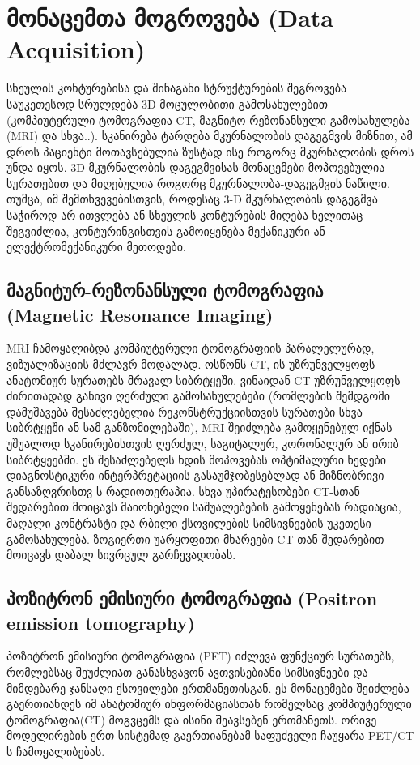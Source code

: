 \documentclass[12pt,a4paper,]{report}
\begin{document}
\chapter{მონაცემთა მოგროვება (Data Acquisition)}
სხეულის კონტურებისა და შინაგანი სტრუქტურების შეგროვება საუკეთესოდ სრულდება 3D მოცულობითი გამოსახულებით (კომპიუტერული ტომოგრაფია CT, მაგნიტო რეზონანსული გამოსახულება (MRI) და სხვა..). სკანირება ტარდება მკურნალობის დაგეგმვის მიზნით, ამ დროს პაციენტი მოთავსებულია ზუსტად ისე როგორც მკურნალობის დროს უნდა იყოს. 3D მკურნალობის დაგეგმვისას მონაცემები მოპოვებულია სურათებით და მიღებულია როგორც მკურნალობა-დაგეგმვის ნაწილი. თუმცა, იმ შემთხვევებისთვის, როდესაც 3-D მკურნალობის დაგეგმვა საჭიროდ არ ითვლება ან სხეულის კონტურების მიღება ხელითაც შეგვიძლია, კონტურინგისთვის გამოიყენება მექანიკური ან ელექტრომექანიკური მეთოდები.

\section{მაგნიტურ-რეზონანსული ტომოგრაფია (Magnetic Resonance Imaging)}
MRI ჩამოყალიბდა კომპიუტერული ტომოგრაფიის პარალელურად, ვიზუალიზაციის მძლავრ მოდალად. ოსწონს CT, ის უზრუნველყოფს ანატომიურ სურათებს მრავალ სიბრტყეში. ვინაიდან CT უზრუნველყოფს ძირითადად განივი ღერძული გამოსახულებები (რომლების შემდგომი დამუშავება შესაძლებელია რეკონსტრუქციისთვის სურათები სხვა სიბრტყეში ან სამ განზომილებაში), MRI შეიძლება გამოყენებულ იქნას უშუალოდ სკანირებისთვის ღერძულ, საგიტალურ, კორონალურ ან ირიბ სიბრტყეებში. ეს შესაძლებელს ხდის მოპოვებას ოპტიმალური ხედები დიაგნოსტიკური ინტერპრეტაციის გასაუმჯობესებლად ან მიზნობრივი განსაზღვრისთვ ს რადიოთერაპია. სხვა უპირატესობები CT-სთან შედარებით მოიცავს მაიონებელი საშუალებების გამოყენებას რადიაცია, მაღალი კონტრასტი და რბილი ქსოვილების სიმსივნეების უკეთესი გამოსახულება. ზოგიერთი უარყოფითი მხარეები CT-თან შედარებით მოიცავს დაბალ სივრცულ გარჩევადობას.

\section{პოზიტრონ ემისიური ტომოგრაფია (Positron emission tomography)}
პოზიტრონ ემისიური ტომოგრაფია (PET) იძლევა ფუნქციურ სურათებს, რომლებსაც შეუძლიათ განასხვავონ ავთვისებიანი სიმსივნეები და მიმდებარე ჯანსაღი ქსოვილები ერთმანეთისგან. ეს მონაცემები შეიძლება გაერთიანდეს იმ ანატომიურ ინფორმაციასთან რომელსაც კომპიუტერული ტომოგრაფია(CT) მოგვცემს და ისინი შეავსებენ ერთმანეთს. ორივე მოდელირების ერთ სისტემად გაერთიანებამ საფუძველი ჩაუყარა PET/CT ს ჩამოყალიბებას.
\end{document}
